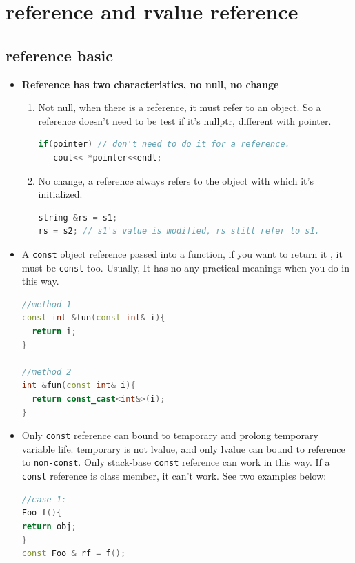 \documentclass[a4paper,12pt,twoside]{book}
\begin{document}
\section{reference and rvalue reference}
\subsection{reference basic}
\begin{itemize}
\item \textbf{Reference has two characteristics, no null, no change}
\begin{enumerate}
\item Not null, when there is a reference, it must refer to an object. So a reference doesn't need to be test if it's nullptr, different with pointer.
\begin{lstlisting}[frame=single, language=c++]
if(pointer) // don't need to do it for a reference.
   cout<< *pointer<<endl;
\end{lstlisting}

\item No change, a reference always refers to the object with which it's initialized.
\begin{lstlisting}[frame=single, language=c++]
string &rs = s1;
rs = s2; // s1's value is modified, rs still refer to s1.
\end{lstlisting}
\end{enumerate}


\item A \texttt{const} object reference passed into a function, if you want to return it , it must be \texttt{const} too. Usually, It has no any practical meanings when you do in this way. 
\begin{lstlisting}[frame=single, language=c++]
//method 1
const int &fun(const int& i){
  return i;
}

//method 2
int &fun(const int& i){
  return const_cast<int&>(i);
}
\end{lstlisting}

\item Only \texttt{const} reference can bound to temporary and prolong temporary variable life. temporary is not lvalue, and only lvalue can bound to reference to \texttt{non-const}. Only stack-base \texttt{const} reference can work in this way. If a \texttt{const} reference is class member, it can't work.  See two examples below:

\begin{lstlisting}[frame=single, language=c++]
//case 1:
Foo f(){
return obj;
}
const Foo & rf = f();


\end{lstlisting}
\end{itemize}
\end{document}

